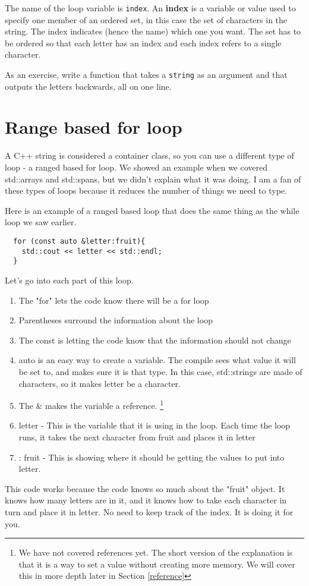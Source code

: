 
The name of the loop variable is {\tt index}.  An {\bf
index} is a variable or value used to specify one member of an ordered
set, in this case the set of characters in the string.  The index
indicates (hence the name) which one you want.  The set has to be
ordered so that each letter has an index and each index
refers to a single character.

As an exercise, write a function that takes a {\tt string}
as an argument and that outputs the letters backwards, all on
one line.
\section{Range based for loop}
A C++ string is considered a container class, so you can
use a different type of loop - a ranged based for loop. 
We showed an example when we covered std::arrays and std::spans, but we
didn't explain what it was doing. I am a fan of these types of
loops because it reduces the number of things we need to type.

Here is an example of a ranged based loop that does the same
thing as the while loop we saw earlier.
\begin{verbatim}
  for (const auto &letter:fruit){
    std::cout << letter << std::endl;
  }
\end{verbatim}
Let's go into each part of this loop. 
\begin{enumerate}
    \item The "for" lets the code know there will be a for loop
    \item Parentheses surround the information about the loop
    \item The const is letting the code know that the information should not change
    \item auto is an easy way to create a variable. The compile sees what value it
    will be set to, and makes sure it is that type. In this case, std::strings are
    made of characters, so it makes letter be a character.
    \item The \& makes the variable a reference. \footnote{We have not covered references yet. The short version of the explanation is that it is a way to set a value without
    creating more memory. We will cover this in more depth later in Section \ref{reference}}
    \item letter - This is the variable that it is using in the loop. Each time the 
    loop runs, it takes the next character from fruit and places it in letter
    \item : fruit - This is showing where it should be getting the values to 
    put into letter.
\end{enumerate}
This code works because the code knows so much about the "fruit" object. It knows
how many letters are in it, and it knows how to take each character in turn and place it
in letter. No need to keep track of the index. It is doing it for you.


